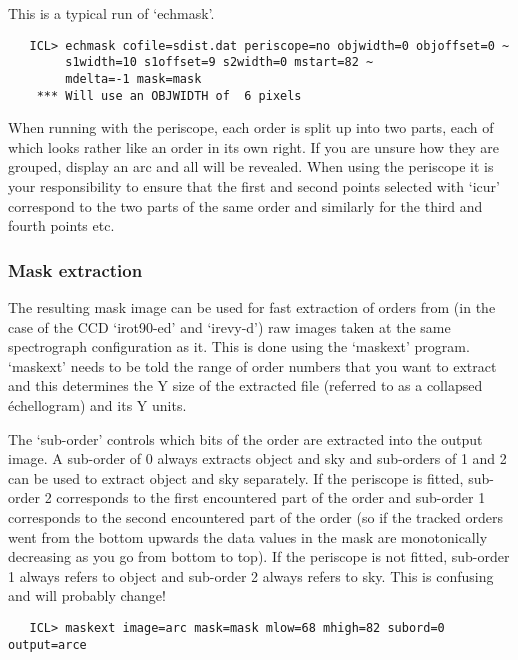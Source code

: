    This is a typical run of `echmask'.

\begin{verbatim}
   ICL> echmask cofile=sdist.dat periscope=no objwidth=0 objoffset=0 ~
        s1width=10 s1offset=9 s2width=0 mstart=82 ~
        mdelta=-1 mask=mask
    *** Will use an OBJWIDTH of  6 pixels
\end{verbatim}

   When running with the periscope, each order is split up into two
   parts, each of which looks rather like an order in its own right. If
   you are unsure how they are grouped, display an arc and all will be
   revealed. When using the periscope it is your responsibility to
   ensure that the first and second points selected with `icur'
   correspond to the two parts of the same order and similarly for the
   third and fourth points etc.


\subsubsection{Mask extraction}

   The resulting mask image can be used for fast extraction of orders
   from (in the case of the CCD `irot90-ed' and `irevy-d') raw images
   taken at the same spectrograph configuration as it. This is done
   using the `maskext' program. `maskext' needs to be told the range
   of order numbers that you want to extract and this determines the Y
   size of the extracted file (referred to as a collapsed \'echellogram)
   and its Y units.

   The `sub-order' controls which bits of the order are extracted into
   the output image. A sub-order of 0 always extracts object and sky and
   sub-orders of 1 and 2 can be used to extract object and sky
   separately. If the periscope is fitted, sub-order 2 corresponds to
   the first encountered part of the order and sub-order 1 corresponds
   to the second encountered part of the order (so if the tracked orders
   went from the bottom upwards the data values in the mask are
   monotonically decreasing as you go from bottom to top). If the
   periscope is not fitted, sub-order 1 always refers to object and
   sub-order 2 always refers to sky. This is confusing and will probably
   change!

\begin{verbatim}
   ICL> maskext image=arc mask=mask mlow=68 mhigh=82 subord=0 output=arce
\end{verbatim}

